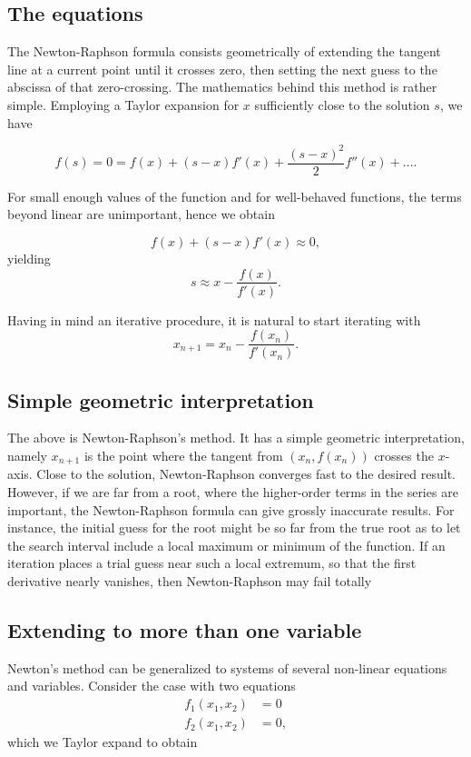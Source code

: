 \documentclass[%
oneside,                 %
final,                   %
10pt]{article}
\begin{document}
\subsection{The equations}

The Newton-Raphson formula consists geometrically of extending the
tangent line at a current point until it crosses zero, then setting
the next guess to the abscissa of that zero-crossing.  The mathematics
behind this method is rather simple. Employing a Taylor expansion for
$x$ sufficiently close to the solution $s$, we have


\[
    f(s)=0=f(x)+(s-x)f'(x)+\frac{(s-x)^2}{2}f''(x) +\dots.
    \label{eq:taylornr}
\]

For small enough values of the function and for well-behaved
functions, the terms beyond linear are unimportant, hence we obtain


\[
   f(x)+(s-x)f'(x)\approx 0,
\]
yielding
\[
   s\approx x-\frac{f(x)}{f'(x)}.
\]

Having in mind an iterative procedure, it is natural to start iterating with
\[
   x_{n+1}=x_n-\frac{f(x_n)}{f'(x_n)}.
\]

\subsection{Simple geometric interpretation}

The above is Newton-Raphson's method. It has a simple geometric
interpretation, namely $x_{n+1}$ is the point where the tangent from
$(x_n,f(x_n))$ crosses the $x$-axis.  Close to the solution,
Newton-Raphson converges fast to the desired result. However, if we
are far from a root, where the higher-order terms in the series are
important, the Newton-Raphson formula can give grossly inaccurate
results. For instance, the initial guess for the root might be so far
from the true root as to let the search interval include a local
maximum or minimum of the function.  If an iteration places a trial
guess near such a local extremum, so that the first derivative nearly
vanishes, then Newton-Raphson may fail totally


\subsection{Extending to more than one variable}

Newton's method can be generalized to systems of several non-linear equations
and variables. Consider the case with two equations
\[
   \begin{array}{cc} f_1(x_1,x_2) &=0\\
                     f_2(x_1,x_2) &=0,\end{array}
\]
which we Taylor expand to obtain
\end{document}
